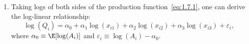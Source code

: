 \begin{enumerate}
\item Taking logs of both sides of the production function~\eqref{eq:1.7.1}, one can
  derive the log-linear relationship:
  \[
    \log(Q_i) = \alpha_0 + \alpha_1\log(x_{i1}) + \alpha_2\log(x_{i2})
      + \alpha_3\log(x_{i3}) + \varepsilon_i,
  \]
  where $\alpha_0 \equiv \E[\log(A_i)]$ and
  $\varepsilon_i \equiv \log(A_i) - \alpha_0$.
\end{enumerate}
